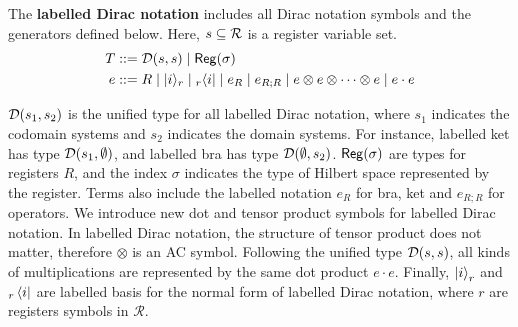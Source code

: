 \begin{definition}
  The \textbf{labelled Dirac notation} includes all Dirac notation symbols and the generators defined below.
  Here, $s\subseteq \mathcal{R}$ is a register variable set.
  \begin{align*}
    T & ::= \mathcal{D}(s,s) \mid \mathsf{Reg}(\sigma) \\
    e & ::= R \mid |i\rangle_r \mid {}_r\langle i| \mid e_R \mid e_{R;R} \mid
    e \otimes e \otimes \cdots \otimes e \mid e \cdot e
  \end{align*}
\end{definition}
$\mathcal{D}(s_1, s_2)$ is the unified type for all labelled Dirac notation, where $s_1$ indicates the codomain systems and $s_2$ indicates the domain systems. For instance, labelled ket has type $\mathcal{D}(s_1, \emptyset)$, and labelled bra has type $\mathcal{D}(\emptyset, s_2)$.
$\mathsf{Reg}(\sigma)$ are types for registers $R$, and the index $\sigma$ indicates the type of Hilbert space represented by the register.
Terms also include the labelled notation $e_R$ for bra, ket and $e_{R;R}$ for operators. We introduce new dot and tensor product symbols for labelled Dirac notation. In labelled Dirac notation, the structure of tensor product does not matter, therefore $\otimes$ is an AC symbol.
Following the unified type $\mathcal{D}(s,s)$, all kinds of multiplications are represented by the same dot product $e \cdot e$.
Finally, $\ket{i}_r$ and ${}_r\bra{i}$ are labelled basis for the normal form of labelled Dirac notation, where $r$ are registers symbols in $\mathcal{R}$. 

